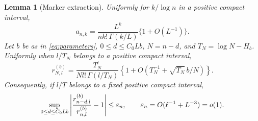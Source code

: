 \documentclass[11pt]{article}
\newtheorem{lemma}[theorem]{Lemma}
\theoremstyle{definition}\newtheorem{definition}[theorem]{Definition}
\theoremstyle{remark}\newtheorem{remark}[theorem]{Remark}
\numberwithin{equation}{section}\allowdisplaybreaks
\begin{document}
\begin{lemma}[Marker extraction]\label{lem:marker}
Uniformly for $k/\log n$ in a positive compact interval,
\begin{equation}\label{eq:akn}
 a_{n,k}=\frac{L^k}{n k!\,\Gamma(k/L)}\{1+O(L^{-1})\}.
\end{equation}
Let $b$ be as in \eqref{eq:parameters}, $0\le d\le C_0 Lb$,
$N=n-d$, and $T_N=\log N-H_b$. Uniformly when $l/T_N$ belongs to a
positive compact interval,
\begin{equation}\label{eq:reservoir-marker}
 r_{N,l}^{(b)}
 =\frac{T_N^l}{N l!\,\Gamma(l/T_N)}
   \left\{1+O\left(T_N^{-1}+\sqrt{T_N}\,b/N\right)\right\}.
\end{equation}
Consequently, if $l/T$ belongs to a fixed positive compact interval,
\begin{equation}\label{eq:flatness}
 \sup_{0\le d\le C_0Lb}
 \left|\frac{r_{n-d,l}^{(b)}}{r_{n,l}^{(b)}}-1\right|
 \le \varepsilon_n,\qquad \varepsilon_n=O(\ell^{-1}+L^{-3})=o(1).
\end{equation}
\end{lemma}
\end{document}
